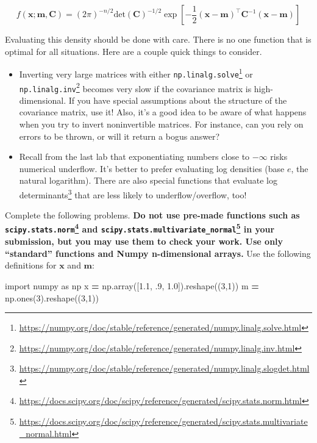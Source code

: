 \documentclass[12pt,krantz2]{krantz}
\makeatletter
\newenvironment{Shaded}{\begin{snugshade}}{\end{snugshade}}
\newcommand{\DecValTok}[1]{\textcolor[rgb]{0.06,0.06,0.06}{#1}}
\newcommand{\FloatTok}[1]{\textcolor[rgb]{0.06,0.06,0.06}{#1}}
\newcommand{\ImportTok}[1]{#1}
\newcommand{\NormalTok}[1]{#1}
\newcommand{\OperatorTok}[1]{\textcolor[rgb]{0.43,0.43,0.43}{\textbf{#1}}}
\renewcommand{\href}[2]{#2\footnote{\url{#1}}}
\newenvironment{kframe}{%
\medskip{}
\setlength{\fboxsep}{.8em}
 \def\at@end@of@kframe{}%
 \ifinner\ifhmode%
  \def\at@end@of@kframe{\end{minipage}}%
  \begin{minipage}{\columnwidth}%
 \fi\fi%
 \def\FrameCommand##1{\hskip\@totalleftmargin \hskip-\fboxsep
 \colorbox{shadecolor}{##1}\hskip-\fboxsep
     \hskip-\linewidth \hskip-\@totalleftmargin \hskip\columnwidth}%
 \MakeFramed {\advance\hsize-\width
   \@totalleftmargin\z@ \linewidth\hsize
   \@setminipage}}%
 {\par\unskip\endMakeFramed%
 \at@end@of@kframe}
\renewenvironment{Shaded}{\begin{kframe}}{\end{kframe}}
\makeatother
\begin{document}
\begin{equation} 
f(\mathbf{x}; \mathbf{m}, \mathbf{C}) = (2\pi)^{-n/2}\text{det}\left( \mathbf{C} \right)^{-1/2}\exp\left[- \frac{1}{2} (\mathbf{x}- \mathbf{m})^\intercal \mathbf{C}^{-1} (\mathbf{x}- \mathbf{m}) \right]
\end{equation}

Evaluating this density should be done with care. There is no one function that is optimal for all situations. Here are a couple quick things to consider.

\begin{itemize}
\item
  Inverting very large matrices with either \href{https://numpy.org/doc/stable/reference/generated/numpy.linalg.solve.html}{\texttt{np.linalg.solve}} or \href{https://numpy.org/doc/stable/reference/generated/numpy.linalg.inv.html}{\texttt{np.linalg.inv}} becomes very slow if the covariance matrix is high-dimensional. If you have special assumptions about the structure of the covariance matrix, use it! Also, it's a good idea to be aware of what happens when you try to invert noninvertible matrices. For instance, can you rely on errors to be thrown, or will it return a bogus answer?
\item
  Recall from the last lab that exponentiating numbers close to \(-\infty\) risks numerical underflow. It's better to prefer evaluating log densities (base \(e\), the natural logarithm). There are also \href{https://numpy.org/doc/stable/reference/generated/numpy.linalg.slogdet.html}{special functions that evaluate log determinants} that are less likely to underflow/overflow, too!
\end{itemize}

Complete the following problems. \textbf{Do not use pre-made functions such as \href{https://docs.scipy.org/doc/scipy/reference/generated/scipy.stats.norm.html}{\texttt{scipy.stats.norm}} and \href{https://docs.scipy.org/doc/scipy/reference/generated/scipy.stats.multivariate_normal.html}{\texttt{scipy.stats.multivariate\_normal}} in your submission, but you may use them to check your work. Use only ``standard'' functions and Numpy n-dimensional arrays.} Use the following definitions for \(\mathbf{x}\) and \(\mathbf{m}\):

\begin{Shaded}
\begin{Highlighting}[]
\ImportTok{import}\NormalTok{ numpy }\ImportTok{as}\NormalTok{ np}
\NormalTok{x }\OperatorTok{=}\NormalTok{ np.array([}\FloatTok{1.1}\NormalTok{, }\FloatTok{.9}\NormalTok{, }\FloatTok{1.0}\NormalTok{]).reshape((}\DecValTok{3}\NormalTok{,}\DecValTok{1}\NormalTok{))}
\NormalTok{m }\OperatorTok{=}\NormalTok{ np.ones(}\DecValTok{3}\NormalTok{).reshape((}\DecValTok{3}\NormalTok{,}\DecValTok{1}\NormalTok{))}
\end{Highlighting}
\end{Shaded}
\end{document}
